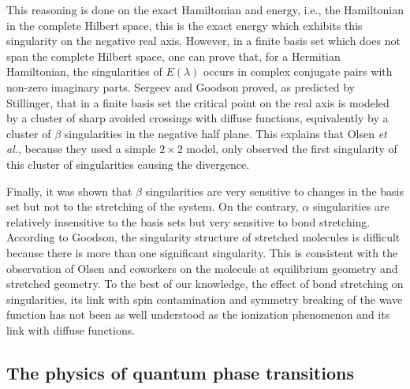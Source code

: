 \documentclass[aps,prb,reprint,noshowkeys,superscriptaddress]{revtex4-1}
\newcommand{\latin}[1]{#1}
\newcommand{\ie}{\latin{i.e.}}
\begin{document}
This reasoning is done on the exact Hamiltonian and energy, \ie, the Hamiltonian in the complete Hilbert space, this is the exact energy which exhibits this singularity on the negative real axis. However, in a finite basis set which does not span the complete Hilbert space, one can prove that, for a Hermitian Hamiltonian, the singularities of $E(\lambda)$ occurs in complex conjugate pairs with non-zero imaginary parts. Sergeev and Goodson proved, \cite{Sergeev_2005} as predicted by Stillinger, \cite{Stillinger_2000} that in a finite basis set the critical point on the real axis is modeled by a cluster of sharp avoided crossings with diffuse functions, equivalently by a cluster of $\beta$ singularities in the negative half plane. This explains that Olsen \textit{et al.}, because they used a simple $2\times2$ model, only observed the first singularity of this cluster of singularities causing the divergence. \cite{Olsen_2000}

Finally, it was shown that $\beta$ singularities are very sensitive to changes in the basis set but not to the stretching of the system. On the contrary, $\alpha$ singularities are relatively insensitive to the basis sets but very sensitive to bond stretching. 
According to Goodson, \cite{Goodson_2004} the singularity structure of stretched molecules is difficult because there is more than one significant singularity. 
This is consistent with the observation of Olsen and coworkers \cite{Olsen_2000} on the  molecule at equilibrium geometry and stretched geometry. 
To the best of our knowledge, the effect of bond stretching on singularities, its link with spin contamination and symmetry breaking of the wave function has not been as well understood as the ionization phenomenon and its link with diffuse functions.  

\subsection{The physics of quantum phase transitions}
\end{document}
